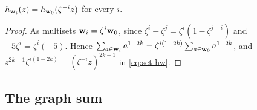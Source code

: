 \begin{lem}
\label{lem:set-hrot}
$h_{\mathbf{w}_i}(z)=h_{\mathbf{w}_0}(\zeta^{-i}z)$ for every $i$.
\end{lem}

\begin{proof}
As multisets $\mathbf{w}_i=\zeta^i\mathbf{w}_0$, since $\zeta^i-\zeta^j=\zeta^i(1-\zeta^{j-i})$ and $-5\zeta^i=\zeta^i(-5)$. Hence $\sum_{a\in\mathbf{w}_i}a^{1-2k}=\zeta^{i(1-2k)}\sum_{a\in\mathbf{w}_0}a^{1-2k}$, and $z^{2k-1}\zeta^{i(1-2k)}=(\zeta^{-i}z)^{2k-1}$ in \eqref{eq:set-hw}.
\end{proof}

\subsection{The graph sum}
\label{sec:set-graph}

